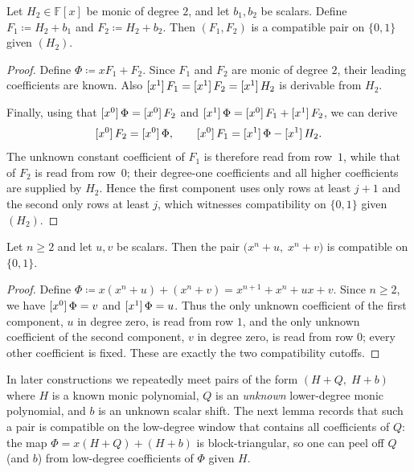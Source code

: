\begin{lemma}\label{lem:compatible-auxhead-deg2}
    Let $H_2\in\mathbb{F}[x]$ be monic of degree $2$, and let $b_1,b_2$ be scalars.
    Define $F_1\coloneqq H_2+b_1$ and $F_2\coloneqq H_2+b_2$.
    Then $(F_1,F_2)$ is a compatible pair on $\{0,1\}$ given $(H_2)$.
\end{lemma}
\begin{proof}
    Define $\Phi\coloneqq xF_1+F_2$.
    Since $F_1$ and $F_2$ are monic of degree $2$, their leading coefficients are known.
    Also $\coeff{F_1}{1}=\coeff{F_2}{1}=\coeff{H_2}{1}$ is derivable from $H_2$.

    Finally, using that $\coeff{\Phi}{0}=\coeff{F_2}{0}$ and $\coeff{\Phi}{1}=\coeff{F_1}{0}+\coeff{F_2}{1}$, we can derive
    \[
        \coeff{F_2}{0}=\coeff{\Phi}{0},
        \qquad
        \coeff{F_1}{0}=\coeff{\Phi}{1}-\coeff{H_2}{1}.
    \]
    The unknown constant coefficient of $F_1$ is therefore read from row~$1$,
    while that of $F_2$ is read from row~$0$; their degree-one coefficients
    and all higher coefficients are supplied by $H_2$.  Hence the first
    component uses only rows at least $j+1$ and the second only rows at least
    $j$, which witnesses compatibility on $\{0,1\}$ given $(H_2)$.
\end{proof}

\begin{lemma}\label{lem:compatible-monic-plus-constants}
    Let $n\ge 2$ and let $u,v$ be scalars.
    Then the pair $\bigl(x^n+u,\;x^n+v\bigr)$ is compatible on $\{0,1\}$.
\end{lemma}
\begin{proof}
    Define $\Phi\coloneqq x(x^n+u)+(x^n+v)=x^{n+1}+x^n+ux+v$.
    Since $n\ge 2$, we have $\coeff{\Phi}{0}=v$ and $\coeff{\Phi}{1}=u$.
    Thus the only unknown coefficient of the first component, $u$ in degree
    zero, is read from row $1$, and the only unknown coefficient of the second
    component, $v$ in degree zero, is read from row $0$; every other
    coefficient is fixed.  These are exactly the two compatibility cutoffs.
\end{proof}

\noindent
In later constructions we repeatedly meet pairs of the form $(H+Q,\;H+b)$ where $H$ is a known monic
polynomial, $Q$ is an \emph{unknown} lower-degree monic polynomial, and $b$ is an unknown scalar shift.
The next lemma records that such a pair is compatible on the low-degree window that contains all
coefficients of $Q$: the map $\Phi=x(H+Q)+(H+b)$ is block-triangular, so one can peel off $Q$ (and $b$)
from low-degree coefficients of $\Phi$ given $H$.


